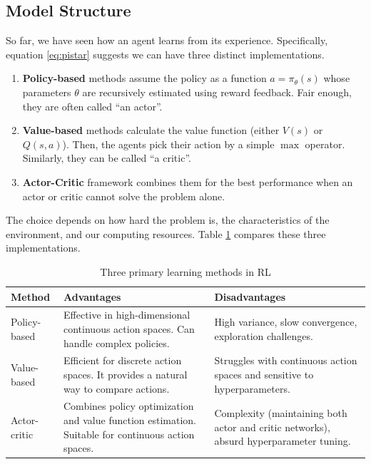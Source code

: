 \documentclass[../main.tex]{subfiles}
\begin{document}
\subsection{Model Structure} \label{sec:model_structure}
So far, we have seen how an agent learns from its experience. Specifically, equation \ref{eq:pistar} suggests we can have three distinct implementations. 
\begin{enumerate}
    \item \textbf{Policy-based} methods assume the policy as a function $a = \pi_{\theta}(s)$ whose parameters $\theta$ are recursively estimated using reward feedback. Fair enough, they are often called “an actor”.
    \item \textbf{Value-based} methods calculate the value function (either $V(s)$ or $Q(s, a)$). Then, the agents pick their action by a simple $\max$ operator. Similarly, they can be called “a critic”.
    \item \textbf{Actor-Critic} framework combines them for the best performance when an actor or critic cannot solve the problem alone.
\end{enumerate}
The choice depends on how hard the problem is, the characteristics of the environment, and our computing resources. Table \ref{tab:rl_techniques} compares these three implementations.
\begin{table}[htb]
    \centering
    \caption{Three primary learning methods in RL}
    \label{tab:rl_techniques}
    \begin{tabular}{l p{6cm} p{6cm}}
        \toprule
        \textbf{Method} & \textbf{Advantages} & \textbf{Disadvantages} \\
        \midrule
        Policy-based & Effective in high-dimensional continuous action spaces. Can handle complex policies. & High variance, slow convergence, exploration challenges. \\
        \addlinespace
        Value-based & Efficient for discrete action spaces. It provides a natural way to compare actions. & Struggles with continuous action spaces and sensitive to hyperparameters. \\
        \addlinespace
        Actor-critic & Combines policy optimization and value function estimation. Suitable for continuous action spaces. & Complexity (maintaining both actor and critic networks), absurd hyperparameter tuning. \\
        \bottomrule
    \end{tabular}
\end{table}
\end{document}

